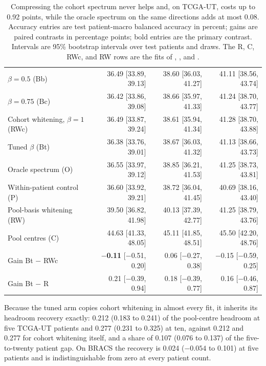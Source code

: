 \begin{table}[htbp]
\begin{tabular}{@{}lrrr@{}}
$\beta=0.5$ (Bb) & 36.49 [33.89, 39.13] & 38.60 [36.03, 41.27] & 41.11 [38.56, 43.74] \\
$\beta=0.75$ (Bc) & 36.42 [33.86, 39.08] & 38.66 [35.97, 41.33] & 41.24 [38.70, 43.77] \\
Cohort whitening, $\beta=1$ (RWc) & 36.49 [33.87, 39.24] & 38.61 [35.94, 41.34] & 41.28 [38.70, 43.88] \\
Tuned $\beta$ (Bt) & 36.38 [33.76, 39.01] & 38.67 [36.03, 41.32] & 41.13 [38.66, 43.73] \\
Oracle spectrum (O) & 36.55 [33.97, 39.12] & 38.85 [36.21, 41.53] & 41.25 [38.73, 43.81] \\
Within-patient control (P) & 36.60 [33.92, 39.21] & 38.72 [36.04, 41.45] & 40.69 [38.16, 43.40] \\
Pool-basis whitening (RW) & 39.50 [36.82, 41.98] & 40.13 [37.39, 42.77] & 41.25 [38.79, 43.76] \\
Pool centres (C) & 44.63 [41.33, 48.05] & 45.11 [41.85, 48.51] & 45.50 [42.20, 48.76] \\
\addlinespace
Gain Bt $-$ RWc & \textbf{$-$0.11} [$-$0.51, 0.20] & 0.06 [$-$0.27, 0.38] & $-$0.15 [$-$0.59, 0.25] \\
Gain Bt $-$ R & 0.21 [$-$0.39, 0.94] & 0.18 [$-$0.39, 0.77] & 0.16 [$-$0.46, 0.87] \\
\bottomrule
\end{tabular}
\caption{Compressing the cohort spectrum never helps and, on TCGA-UT, costs up to 0.92 points, while the oracle spectrum on the same directions adds at most 0.08. Accuracy entries are test patient-macro balanced accuracy in percent; gains are paired contrasts in percentage points; bold entries are the primary contrast. Intervals are 95\% bootstrap intervals over test patients and draws. The R, C, RWc, and RW rows are the fits of \citet{queisler2026centreError}, \citet{queisler2026patientDirections}, and \citet{queisler2026bracsMechanism}.}
\label{tab:accuracy}
\end{table}

\noindent Because the tuned arm copies cohort whitening in almost every fit, it inherits its headroom recovery exactly: 0.212 (0.183 to 0.241) of the pool-centre headroom at five TCGA-UT patients and 0.277 (0.231 to 0.325) at ten, against 0.212 and 0.277 for cohort whitening itself, and a share of 0.107 (0.076 to 0.137) of the five-to-twenty patient gap. On BRACS the recovery is 0.024 ($-0.054$ to 0.101) at five patients and is indistinguishable from zero at every patient count.

